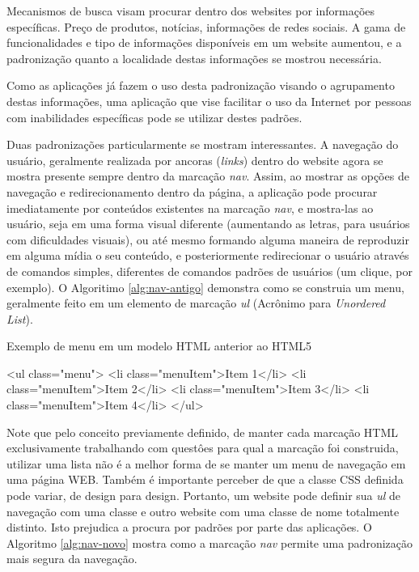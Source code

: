 \documentclass[
	12pt,				%
	oneside,			%
	a4paper,			%
	english,			%
	brazil				%
	]{abntex2ppgsi}
\begin{document}
Mecanismos de busca visam procurar dentro dos websites por informações específicas. Preço de produtos, notícias, informações de redes sociais. A gama de funcionalidades e tipo de informações disponíveis em um website aumentou, e a padronização quanto a localidade destas informações se mostrou necessária. 

Como as aplicações já fazem o uso desta padronização visando o agrupamento destas informações, uma aplicação que vise facilitar o uso da Internet por pessoas com inabilidades específicas pode se utilizar destes padrões. 

Duas padronizações particularmente se mostram interessantes. A navegação do usuário, geralmente realizada por ancoras (\textit{links}) dentro do website agora se mostra presente sempre dentro da marcação \textit{nav}. Assim, ao mostrar as opções de navegação e redirecionamento dentro da página, a aplicação pode procurar imediatamente por conteúdos existentes na marcação \textit{nav}, e mostra-las ao usuário, seja em uma forma visual diferente (aumentando as letras, para usuários com dificuldades visuais), ou até mesmo formando alguma maneira de reproduzir em alguma mídia o seu conteúdo, e posteriormente redirecionar o usuário através de comandos simples, diferentes de comandos padrões de usuários (um clique, por exemplo). O Algoritimo \ref{alg:nav-antigo} demonstra como se construia um menu, geralmente feito em um elemento de marcação \textit{ul} (Acrônimo para \textit{Unordered List}). 

\begin{algorithm}[htbp]
	\caption{Exemplo de menu em um modelo HTML anterior ao HTML5}
	\label{alg:nav-antigo}
	\begin{algorithmic}
		\State \textless ul class="menu"\textgreater
			\State \textless li class="menuItem"\textgreater Item 1\textless/li\textgreater
			\State \textless li class="menuItem"\textgreater Item 2\textless/li\textgreater
			\State \textless li class="menuItem"\textgreater Item 3\textless/li\textgreater
			\State \textless li class="menuItem"\textgreater Item 4\textless/li\textgreater
		\State	\textless/ul\textgreater
	\end{algorithmic}
\end{algorithm}

Note que pelo conceito previamente definido, de manter cada marcação HTML exclusivamente trabalhando com questôes para qual a marcação foi construida, utilizar uma lista não é a melhor forma de se manter um menu de navegação em uma página WEB. Também é importante perceber de que a classe CSS definida pode variar, de design para design. Portanto, um website pode definir sua \textit{ul} de navegação com uma classe e outro website com uma classe de nome totalmente distinto. Isto prejudica a procura por padrões por parte das aplicações. O Algoritmo \ref{alg:nav-novo} mostra como a marcação \textit{nav} permite uma padronização mais segura da navegação.
\end{document}
